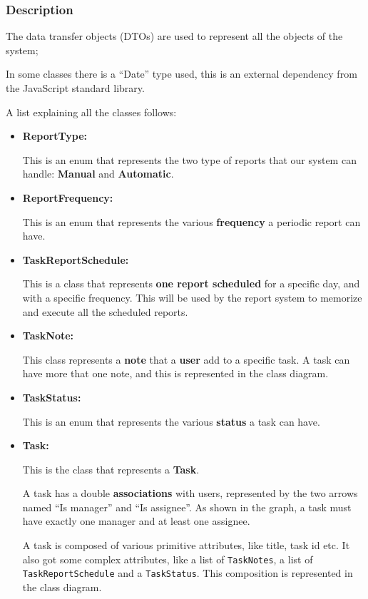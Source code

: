 \documentclass{article}
\begin{document}
\subsubsection{Description}

The data transfer objects (DTOs) are used to represent
all the objects of the system;

In some classes there is a ``Date'' type used, this is an external dependency
from the JavaScript standard library.

A list explaining all the classes follows:

\begin{itemize}
    \item \textbf{ReportType: }

    This is an enum that represents the two type of reports that our system can handle: \textbf{Manual} and \textbf{Automatic}.

    \item \textbf{ReportFrequency: }

    This is an enum that represents the various \textbf{frequency} a periodic report can have.

    \item \textbf{TaskReportSchedule: }

    This is a class that represents \textbf{one report scheduled} for a specific day, and with a specific frequency.
    This will be used by the report system to memorize and execute all the scheduled reports.

    \item \textbf{TaskNote: }
    
    This class represents a \textbf{note} that a \textbf{user} add to a specific task.
    A task can have more that one note, and this is represented in the class diagram.

    \item \textbf{TaskStatus: }
    
    This is an enum that represents the various \textbf{status} a task can have.

    \item \textbf{Task: }
    
    This is the class that represents a \textbf{Task}.

    A task has a double \textbf{associations} with users, represented by the two arrows named ``Is manager'' and ``Is assignee''.
    As shown in the graph, a task must have exactly one manager and at least one assignee.

    A task is composed of various primitive attributes, like title, task id etc. 
    It also got some complex attributes, like a list of \texttt{TaskNotes}, a list of \texttt{TaskReportSchedule} 
    and a \texttt{TaskStatus}. This composition is represented in the class diagram. 


\end{itemize}
\end{document}
